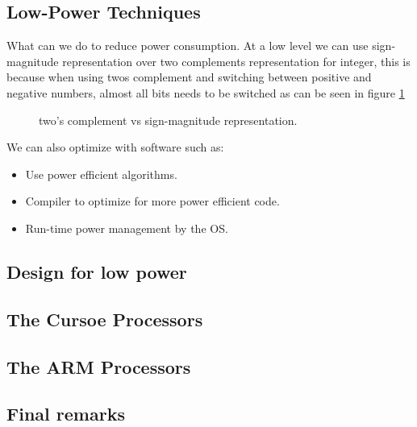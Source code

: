 \subsection{Low-Power Techniques}
What can we do to reduce power consumption. At a low level we can use sign-magnitude representation over two complements representation for integer, this is because when using twos complement and switching between positive and negative numbers, almost all bits needs to be switched as can be seen in figure \ref{fig:2comp-vs-sign}

\begin{figure}[H]
  \centering
  \caption{two's complement vs sign-magnitude representation.}
  \label{fig:2comp-vs-sign}
\end{figure}

We can also optimize with software such as:
\begin{itemize}
\item Use power efficient algorithms.
\item Compiler to optimize for more power efficient code.
\item Run-time power management by the OS.
\end{itemize}


\subsection{Design for low power }
\subsection{The Cursoe Processors}
\subsection{The ARM Processors}
\subsection{Final remarks}
